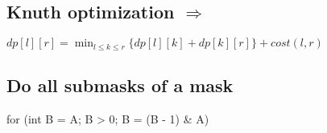 \subsection{Knuth optimization  $\Rightarrow$  } 
$ dp[l][r] = \min_{l \leq k \leq r}\{dp[l][k] + dp[k][r]\} + cost(l, r)$ \\

\subsection{Do all submasks of a mask}
\begin{code}
for (int B = A; B > 0; B = (B - 1) & A)
\end{code}

